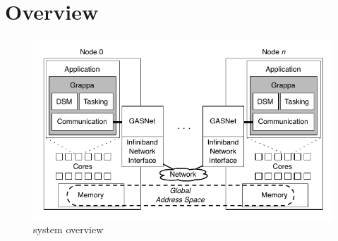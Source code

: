 \section{\Grappa Overview}

\begin{figure}[t]
\begin{center}
  \includegraphics[width=0.95\columnwidth]{figs/system-overview}
\begin{minipage}{0.95\columnwidth}
  \caption{\label{fig:grappa} \Grappa system overview}
\end{minipage}
\vspace{-3ex}
\end{center}
\end{figure}


